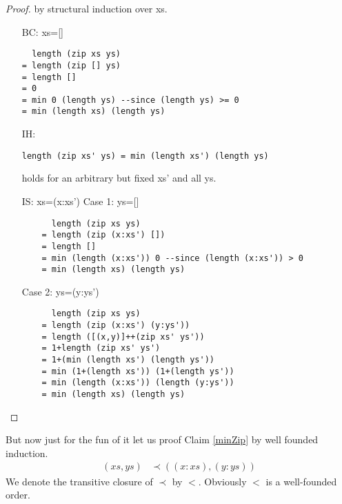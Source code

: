 \documentclass[]{article}
\theoremstyle{definition}
\begin{document}
\begin{proof} by structural induction over xs.
\begin{itemize}
\item[BC:]xs=[]
\begin{verbatim}
  length (zip xs ys)
= length (zip [] ys)
= length []
= 0
= min 0 (length ys) --since (length ys) >= 0
= min (length xs) (length ys)
\end{verbatim}
\item[IH:]
\begin{verbatim}
length (zip xs' ys) = min (length xs') (length ys)
\end{verbatim}
holds for an arbitrary but fixed xs' and all ys.
\item[IS:]xs=(x:xs')
\subitem Case 1: ys=[]
\begin{verbatim}
	  length (zip xs ys)
	= length (zip (x:xs') []) 
	= length []
	= min (length (x:xs')) 0 --since (length (x:xs')) > 0
	= min (length xs) (length ys)
\end{verbatim}
\subitem Case 2: ys=(y:ys')
\begin{verbatim}
	  length (zip xs ys)
	= length (zip (x:xs') (y:ys')) 
	= length ([(x,y)]++(zip xs' ys'))
	= 1+length (zip xs' ys')
	= 1+(min (length xs') (length ys'))
	= min (1+(length xs')) (1+(length ys'))
	= min (length (x:xs')) (length (y:ys'))
	= min (length xs) (length ys)
\end{verbatim}
\end{itemize}
\end{proof}
But now just for the fun of it let us proof Claim \ref{minZip} by well founded induction.
\begin{align*}
(xs,ys)&\prec((x:xs),(y:ys))
\end{align*}
We denote the transitive closure of $\prec$ by $<$. Obviously $<$ is a well-founded order.
\end{document}
